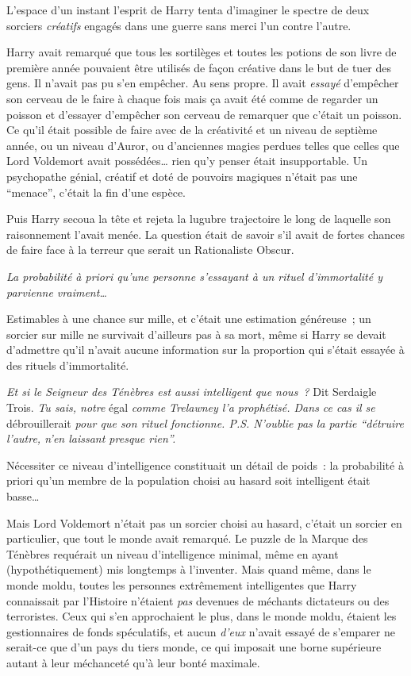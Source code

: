 L'espace d'un instant l'esprit de Harry tenta d'imaginer le spectre de deux sorciers \emph{créatifs} engagés dans une guerre sans merci l'un contre l'autre.

Harry avait remarqué que tous les sortilèges et toutes les potions de son livre de première année pouvaient être utilisés de façon créative dans le but de tuer des gens. Il n'avait pas pu s'en empêcher. Au sens propre. Il avait \emph{essayé} d'empêcher son cerveau de le faire à chaque fois mais ça avait été comme de regarder un poisson et d'essayer d'empêcher son cerveau de remarquer que c'était un poisson. Ce qu'il était possible de faire avec de la créativité et un niveau de septième année, ou un niveau d'Auror, ou d'anciennes magies perdues telles que celles que Lord Voldemort avait possédées… rien qu'y penser était insupportable. Un psychopathe génial, créatif et doté de pouvoirs magiques n'était pas une “menace”, c'était la fin d'une espèce.

Puis Harry secoua la tête et rejeta la lugubre trajectoire le long de laquelle son raisonnement l'avait menée. La question était de savoir s'il avait de fortes chances de faire face à la terreur que serait un Rationaliste Obscur.

\emph{La probabilité à priori qu'une personne s'essayant à un rituel d'immortalité y parvienne vraiment…}

Estimables à une chance sur mille, et c'était une estimation généreuse~; un sorcier sur mille ne survivait d'ailleurs pas à sa mort, même si Harry se devait d'admettre qu'il n'avait aucune information sur la proportion qui s'était essayée à des rituels d'immortalité.

\emph{Et si le Seigneur des Ténèbres est aussi intelligent que nous~?} Dit Serdaigle Trois. \emph{Tu sais, notre} égal \emph{comme Trelawney l'a prophétisé. Dans ce cas il se} débrouillerait \emph{pour que son rituel fonctionne. P.S. N'oublie pas la partie “détruire l'autre, n'en laissant presque rien”.}

Nécessiter ce niveau d'intelligence constituait un détail de poids~: la probabilité à priori qu'un membre de la population choisi au hasard soit intelligent était basse…

Mais Lord Voldemort n'était pas un sorcier choisi au hasard, c'était un sorcier en particulier, que tout le monde avait remarqué. Le puzzle de la Marque des Ténèbres requérait un niveau d'intelligence minimal, même en ayant (hypothétiquement) mis longtemps à l'inventer. Mais quand même, dans le monde moldu, toutes les personnes extrêmement intelligentes que Harry connaissait par l'Histoire n'étaient \emph{pas} devenues de méchants dictateurs ou des terroristes. Ceux qui s'en approchaient le plus, dans le monde moldu, étaient les gestionnaires de fonds spéculatifs, et aucun \emph{d'eux} n'avait essayé de s'emparer ne serait-ce que d'un pays du tiers monde, ce qui imposait une borne supérieure autant à leur méchanceté qu'à leur bonté maximale.

